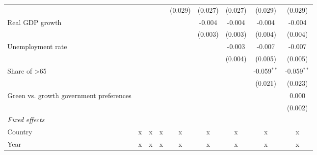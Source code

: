 \begin{table}[htbp]
\begin{tabular}{lcccccccc}
                                                                                       &         &         &                & (0.029)        & (0.027)        & (0.027)        & (0.029)        & (0.029)\\   
      Real GDP growth                                                                  &         &         &                &                & -0.004         & -0.004         & -0.004         & -0.004\\   
                                                                                       &         &         &                &                & (0.003)        & (0.003)        & (0.004)        & (0.004)\\   
      Unemployment rate                                                                &         &         &                &                &                & -0.003         & -0.007         & -0.007\\   
                                                                                       &         &         &                &                &                & (0.004)        & (0.005)        & (0.005)\\   
      Share of >65                                                                     &         &         &                &                &                &                & -0.059$^{**}$  & -0.059$^{**}$\\   
                                                                                       &         &         &                &                &                &                & (0.021)        & (0.023)\\   
      Green vs. growth government preferences                                          &         &         &                &                &                &                &                & 0.000\\   
                                                                                       &         &         &                &                &                &                &                & (0.002)\\   
      \emph{Fixed effects}\\
      Country                                                                          & x       & x       & x              & x              & x              & x              & x              & x\\  
      Year                                                                             & x       & x       & x              & x              & x              & x              & x              & x\\  

\end{tabular}
\end{table}
